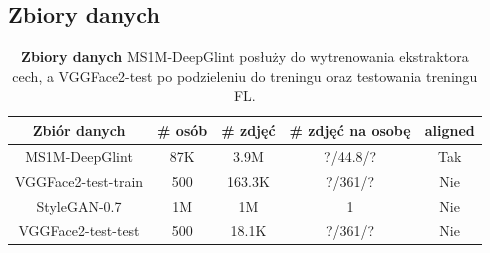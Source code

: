   \subsection{Zbiory danych}
  \begin{table}[H]
  \begin{center}
  \begin{tabular}{ccccc}
  \hline
  Zbiór danych  & \# osób   &   \# zdjęć  &   \# zdjęć na osobę   &   aligned \\
  \hline
  MS1M-DeepGlint \cite{glintweb}   & 87K  & 3.9M & ?/44.8/? & Tak \\
  \hline
  \hline
  VGGFace2-test-train   & 500 & 163.3K & ?/361/? & Nie  \\
  StyleGAN-0.7   & 1M & 1M & 1 & Nie  \\
  \hline
  \hline
  VGGFace2-test-test    & 500 & 18.1K & ?/361/? & Nie  \\
  \hline
  \end{tabular}
  \end{center}
  \caption{\textbf{Zbiory danych} MS1M-DeepGlint posłuży do wytrenowania ekstraktora cech, a VGGFace2-test po podzieleniu do treningu oraz testowania treningu FL.} \label{table:dataset-FL}
  \vspace{-4mm}
  \end{table}

